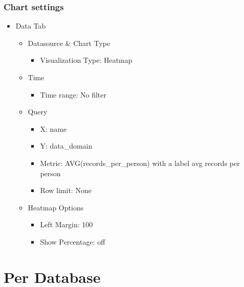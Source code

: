 \documentclass[
]{book}
\providecommand{\tightlist}{%
  \setlength{\itemsep}{0pt}\setlength{\parskip}{0pt}}
\begin{document}
\hypertarget{chart-settings-28}{%
\subsubsection*{Chart settings}\label{chart-settings-28}}

\begin{itemize}
\tightlist
\item
  Data Tab

  \begin{itemize}
  \tightlist
  \item
    Datasource \& Chart Type

    \begin{itemize}
    \tightlist
    \item
      Visualization Type: Heatmap
    \end{itemize}
  \item
    Time

    \begin{itemize}
    \tightlist
    \item
      Time range: No filter
    \end{itemize}
  \item
    Query

    \begin{itemize}
    \tightlist
    \item
      X: name
    \item
      Y: data\_domain
    \item
      Metric: AVG(records\_per\_person) with a label avg records per person
    \item
      Row limit: None
    \end{itemize}
  \item
    Heatmap Options

    \begin{itemize}
    \tightlist
    \item
      Left Margin: 100
    \item
      Show Percentage: off
    \end{itemize}
  \end{itemize}
\end{itemize}

\hypertarget{PerDatabaseDashboard}{%
\section{Per Database}\label{PerDatabaseDashboard}}
\end{document}

